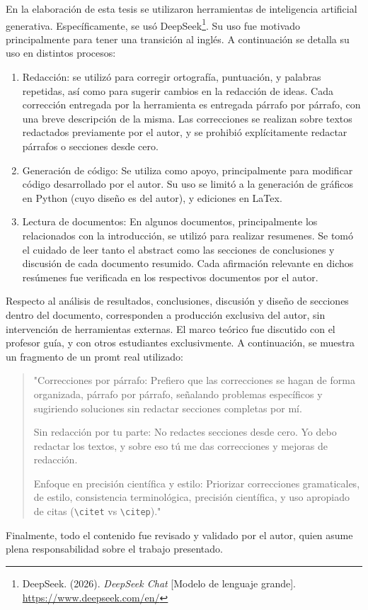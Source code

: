 \documentclass[
	english, %
	letterpaper, oneside
]{book}
\begin{document}
\begin{iausedeclaration}
	En la elaboración de esta tesis se utilizaron herramientas de inteligencia artificial generativa. Específicamente, se usó DeepSeek\footnote{DeepSeek. (2026). \textit{DeepSeek Chat} [Modelo de lenguaje grande]. \url{https://www.deepseek.com/en/}}. Su uso fue motivado principalmente para tener una transición al inglés. A continuación se detalla su uso en distintos procesos:
	
	\begin{enumerate}
		\item Redacción: se utilizó para corregir ortografía, puntuación, y palabras repetidas, así como para sugerir cambios en la redacción de ideas. Cada corrección entregada por la herramienta es entregada párrafo por párrafo, con una breve descripción de la misma. Las correcciones se realizan sobre textos redactados previamente por el autor, y se prohibió explícitamente redactar párrafos o secciones desde cero.
		\item Generación de código: Se utiliza como apoyo, principalmente para modificar código desarrollado por el autor. Su uso se limitó a la generación de gráficos en Python (cuyo diseño es del autor), y ediciones en LaTex. 
		\item Lectura de documentos: En algunos documentos, principalmente los relacionados con la introducción, se utilizó para realizar resumenes. Se tomó el cuidado de leer tanto el abstract como las secciones de conclusiones y discusión de cada documento resumido. Cada afirmación relevante en dichos resúmenes fue verificada en los respectivos documentos por el autor.
	\end{enumerate}
	
	Respecto al análisis de resultados, conclusiones, discusión y diseño de secciones dentro del documento, corresponden a producción exclusiva del autor, sin intervención de herramientas externas. El marco teórico fue discutido con el profesor guía, y con otros estudiantes exclusivmente. A continuación, se muestra un fragmento de un promt real utilizado:
	
	\begin{quote}
		"Correcciones por párrafo: Prefiero que las correcciones se hagan de forma organizada, párrafo por párrafo, señalando problemas específicos y sugiriendo soluciones sin redactar secciones completas por mí.
		
		Sin redacción por tu parte: No redactes secciones desde cero. Yo debo redactar los textos, y sobre eso tú me das correcciones y mejoras de redacción.
		
		Enfoque en precisión científica y estilo: Priorizar correcciones gramaticales, de estilo, consistencia terminológica, precisión científica, y uso apropiado de citas (\verb|\citet| vs \verb|\citep|)."
	\end{quote}
	
	Finalmente, todo el contenido fue revisado y validado por el autor, quien asume plena responsabilidad sobre el trabajo presentado.
\end{iausedeclaration}

\templateFinalcfg





\end{document}
